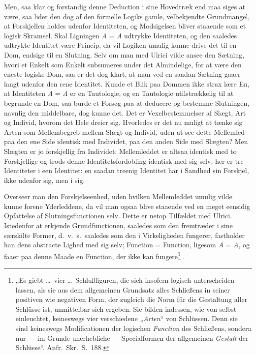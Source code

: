 \documentclass[12pt]{book}
\newcommand{\opage}[1]{\marginnote{\footnotesize\textit{[#1]}}}
\begin{document}
Men, saa klar og forstandig denne Deduction i sine Hovedtræk end maa siges at være, saa lider den dog af den formelle Logiks gamle, velbekjendte Grundmangel, at Forskjellen holdes udenfor Identiteten, og Modsigelsen bliver staaende som et logisk Skramsel. Skal Ligningen \textit{A} = \textit{A} udtrykke Identiteten, og den saaledes udtrykte Identitet være Princip, da vil Logiken umulig kunne drive det til en Dom, endsige til en Slutning. Selv om man med Ulrici vilde ansee den Sætning, hvori et Enkelt som Enkelt subsumeres under det Almindelige, for at være den eneste logiske Dom, saa er det dog klart, at man ved en saadan Sætning gaaer langt udenfor den rene Identitet. Kunde et Blik paa Dommen ikke strax lære En, at Identiteten \textit{A} = \textit{A} er en Tautologie, og en Tautologie utilstrækkelig til at begrunde en Dom, saa
\opage{322}burde et Forsøg paa at deducere og bestemme Slutningen, navnlig den middelbare, dog kunne det. Det er Vexelbestemmelser af Slægt, Art og Individ, hvorom det Hele dreier sig. Hvorledes er det nu muligt at tænke sig Arten som Mellembegreb mellem Slægt og Individ, uden at see dette Mellemled paa den ene Side identisk med Individet, paa den anden Side med Slægten? Men Slægten er jo forskjellig fra Individet; Mellemleddet er altsaa identisk med to Forskjellige og trods denne Identitetsfordobling identisk med sig selv; her er tre Identiteter i een Identitet: en saadan treenig Identitet har i Sandhed sin Forskjel, ikke udenfor sig, men i sig.

Overseer man den Forskjelseenhed, uden hvilken Mellemleddet umulig vilde kunne forene Yderleddene, da vil man ogsaa blive staaende ved en meget eensidig Opfattelse af Slutningsfunctionen selv. Dette er netop Tilfældet med Ulrici. Istedenfor at erkjende Grundfunctionen, saaledes som den fremtræder i sine særskilte Former, d.\ v.\ s.\ saaledes som den i Virkeligheden fungerer, fastholder han dens abstracte Lighed med sig selv; Function = Function, ligesom \textit{A} = \textit{A}, og faaer paa denne Maade en Function, der ikke kan fungere\footnote{„Es giebt \dots\ vier \dots\ Schlußfiguren, die sich insofern logisch unterscheiden lassen, als sie aus dem allgemeinen Grundsatz alles Schließens in seiner positiven wie negativen Form, der zugleich die Norm für die Gestaltung aller Schlüsse ist, unmittelbar sich ergeben. Sie bilden indessen, wie von selbst einleuchtet, keineswegs vier verschiedene „\emph{Arten}“ von Schlüssen. Denn sie sind keineswegs Modificationen der logischen \emph{Function} des Schließens, sondern nur --- im Grunde unerhebliche --- Specialformen der allgemeinen \emph{Gestalt} der Schlüsse“. Anfr.\ Skr.\ S.~188.}%
.
\end{document}

